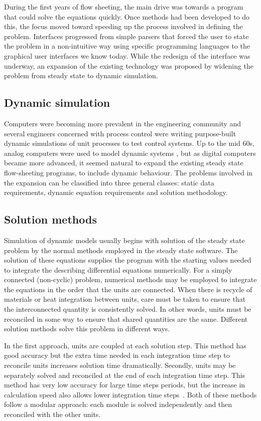 During the first years of flow sheeting, the main drive was towards a program that could solve the equations quickly.  
Once methods had been developed to do this, the focus moved toward speeding up the process involved in defining the problem.  
Interfaces progressed from simple parsers that forced the user to state the problem in a non-intuitive way using specific programming languages to the graphical user interfaces we know today.  
While the redesign of the interface was underway, an expansion of the existing technology was proposed by widening the problem from steady state to dynamic simulation.

\subsection{Dynamic simulation}
Computers were becoming more prevalent in the engineering community and several engineers concerned with process control were writing purpose-built dynamic simulations of unit processes to test control systems.  
Up to the mid 60s, analog computers were used to model dynamic systems \citep{husain1986chemical}, but as digital computers became more advanced, it seemed natural to expand the existing steady state flow-sheeting programs, to include dynamic behaviour. 
The problems involved in the expansion can be classified into three general classes: static data requirements, dynamic equation requirements and solution methodology.

\subsection{Solution methods}
Simulation of dynamic models usually begins with solution of the steady state problem by the normal methods employed in the steady state software.  
The solution of these equations supplies the program with the starting values needed to integrate the describing differential equations numerically.  
For a simply connected (non-cyclic) problem, numerical methods may be employed to integrate the equations in the order that the units are connected.  
When there is recycle of materials or heat integration between units, care must be taken to ensure that the interconnected quantity is consistently solved.  
In other words, units must be reconciled in some way to ensure that shared quantities are the same.  
Different solution methods solve this problem in different ways.

In the first approach, units are coupled at each solution step.  
This method has good accuracy but the extra time needed in each integration time step to reconcile units increases solution time dramatically.
Secondly, units may be separately solved and reconciled at the end of each integration time step.  
This method has very low accuracy for large time steps periods, but the increase in calculation speed also allows lower integration time steps~\citep{husain1986chemical}.  
Both of these methods follow a modular approach: each module is solved independently and then reconciled with the other units.

